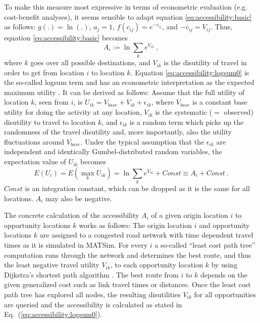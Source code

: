 To make this measure most expressive in terms of econometric evaluation (e.g. cost-benefit analyses), it seems sensible to adapt equation \ref{eq:accessibility:basic} as follows: $g(.) = \ln(.)$, $a_j = 1$, $f(c_{ij}) = e^{-c_{ij}}$, and $-c_{ij} = V_{ij}$. Thus, equation \ref{eq:accessibility:basic} becomes
\begin{equation}
A_i := \ln \sum_k e^{V_{ik}} \ ,
\label{eq:accessibility:logsum0}
\end{equation}
where $k$ goes over all possible destinations, and $V_{ik}$ is the
disutility of travel in order to get from location $i$ to location
$k$. Equation \ref{eq:accessibility:logsum0} is the so-called logsum term and has an econometric interpretation as the expected maximum utility \citep[e.g.][]{Ben-AkivaBook}. It can be derived as follows: Assume that the full utility of location $k$, seen from $i$, is $U_{ik} = V_{base} + V_{ik} + \epsilon_{ik}$, where $V_{base}$ is a constant base utility for doing the activity at any location, $V_{ik}$ is the systematic ($=$ observed) disutility to travel to location $k$, and $\epsilon_{ik}$ is a random term which picks up the randomness of the travel disutility and, more importantly, also the utility fluctuations around $V_{base}$.  Under the typical assumption that the $\epsilon_{ik}$ are independent and identically Gumbel-distributed random variables, the expectation value of $U_{ik}$ becomes
\begin{equation}
E(U_i) = E(\max_k U_{ik}) = \ln \sum_k e^{V_{ik}} + Const \equiv A_i + Const \ .
\end{equation}
$Const$ is an integration constant, which can be dropped as it is the same for all locations. $A_i$ may also be negative.

The concrete calculation of the accessibility $A_i$ of a given origin location $i$ to opportunity locations $k$ works as follows: The origin location $i$ and opportunity locations $k$ are assigned to a congested road network with time dependent travel times as it is simulated in MATSim. For every $i$ a so-called ``least cost path tree'' computation runs through the network and determines the best route, and thus the least negative travel utility $V_{ik}$, to each opportunity location $k$ by using Dijkstra's shortest path algorithm \citep{Dijkstra1959ShortestPath}. The best route from $i$ to $k$ depends on the given generalized cost such as link travel times or distances. Once the least cost path tree has explored all nodes, the resulting disutilities $V_{ik}$ for all opportunities are queried and the accessibility is calculated as stated in Eq.~(\ref{eq:accessibility:logsum0}).


